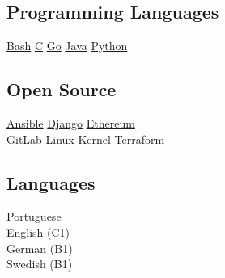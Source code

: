 \documentclass[]{willianpaixao-resume}
\begin{document}
\begin{minipage}[t]{0.30\textwidth}
\subsection{Programming Languages}
\href{https://www.gnu.org/software/bash/}{Bash}\textbullet{}
\href{https://en.wikipedia.org/wiki/C_(programming_language)}{C}\textbullet{}
\href{https://go.dev/}{Go}\textbullet{}
\href{https://www.java.com/}{Java}\textbullet{}
\href{https://www.python.org}{Python}
\sectionsep

\subsection{Open Source}
\href{https://www.ansible.com/}{Ansible}\textbullet{}
\href{https://www.djangoproject.com/}{Django}\textbullet{}
\href{https://ethereum.org/}{Ethereum}\\
\href{https://about.gitlab.com/}{GitLab}\textbullet{}
\href{https://kernel.org/}{Linux Kernel}\textbullet{}
\href{https://www.terraform.io/}{Terraform}
\sectionsep


\subsection{Languages}
Portuguese\\
English (C1)\\
German (B1)\\
Swedish (B1)
\sectionsep


\end{minipage}
\hfill
\end{document}
